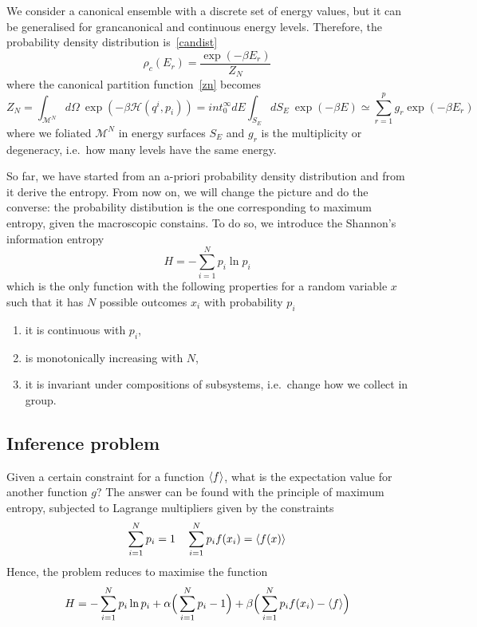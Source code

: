     We consider a canonical ensemble with a discrete set of energy values, but it can be generalised for grancanonical and continuous energy levels. Therefore, the probability density distribution is~\eqref{candist}
    \begin{equation*}
        \rho_c (E_r) = \frac{\exp(-\beta E_r)}{Z_N}
    \end{equation*}
    where the canonical partition function~\eqref{zn} becomes 
    \begin{equation*}
        Z_N = \int_{\mathcal M^N} d\Omega~ \exp(-\beta \mathcal H(q^i, p_i)) = int_0^\infty dE \int_{S_E} dS_E ~ \exp(-\beta E) \simeq \sum_{r=1}^{p} g_r \exp(-\beta E_r)
    \end{equation*}
    where we foliated $\mathcal M^N$ in energy surfaces $S_E$ and $g_r$ is the multiplicity or degeneracy, i.e.~how many levels have the same energy.

    So far, we have started from an a-priori probability density distribution and from it derive the entropy. From now on, we will change the picture and do the converse: the probability distibution is the one corresponding to maximum entropy, given the macroscopic constains. To do so, we introduce the Shannon's information entropy
    \begin{equation*}
        H = - \sum_{i = 1}^{N} p_i \ln p_i
    \end{equation*}
    which is the only function with the following properties for a random variable $x$ such that it has $N$ possible outcomes $x_i$ with probability $p_i$ 
    \begin{enumerate}
        \item it is continuous with $p_i$,
        \item is monotonically increasing with $N$,
        \item it is invariant under compositions of subsystems, i.e.~change how we collect in group.
    \end{enumerate}

\subsection{Inference problem}

    Given a certain constraint for a function $\langle f\rangle$, what is the expectation value for another function $g$? The answer can be found with the principle of maximum entropy, subjected to Lagrange multipliers given by the constraints 
    \begin{equation*}
        \sum_{i=1}^{N} p_i = 1 \quad \sum_{i=1}^{N} p_i f(x_i) = \langle f(x)\rangle
    \end{equation*}
    Hence, the problem reduces to maximise the function
    \begin{equation}\label{entr}
        H = - \sum_{i=1}^{N} p_i \ln p_i + \alpha \Big( \sum_{i=1}^{N} p_i - 1 \Big) + \beta \Big( \sum_{i=1}^{N} p_i f(x_i) - \langle f\rangle \Big)
    \end{equation}

